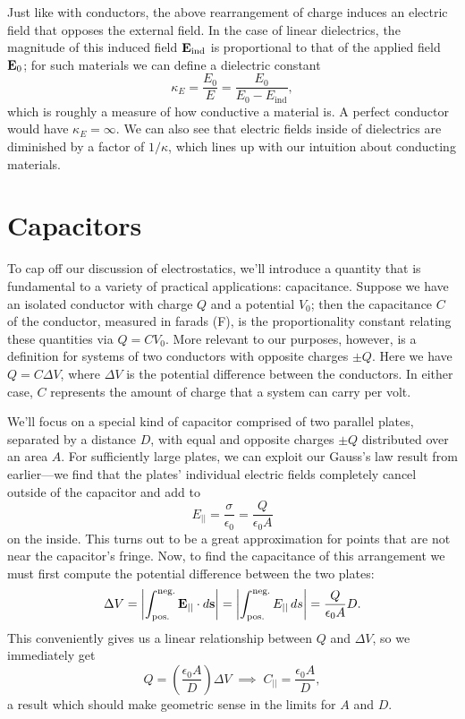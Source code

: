 \documentclass[../p051main.tex]{subfiles}
\begin{document}
Just like with conductors, the above rearrangement of charge induces an electric field that opposes the external field.
In the case of linear dielectrics, the magnitude of this induced field $\mathbf{E}_\textrm{ind}$ is proportional to that of the applied field $\mathbf{E}_0$; for such materials we can define a dielectric constant
\[ \kappa_E = \frac{E_0}{E} = \frac{E_0}{E_0 - E_\textrm{ind}}, \]
which is roughly a measure of how conductive a material is.
A perfect conductor would have $\kappa_E = \infty$.
We can also see that electric fields inside of dielectrics are diminished by a factor of $1 / \kappa$, which lines up with our intuition about conducting materials.

\section{Capacitors}
To cap off our discussion of electrostatics, we'll introduce a quantity that is fundamental to a variety of practical applications: capacitance.
Suppose we have an isolated conductor with charge $Q$ and a potential $V_0$; then the capacitance $C$ of the conductor, measured in farads (F), is the proportionality constant relating these quantities via $Q = CV_0$.
More relevant to our purposes, however, is a definition for systems of two conductors with opposite charges $\pm Q$.
Here we have $Q = C \Delta V$, where $\Delta V$ is the potential difference between the conductors.
In either case, $C$ represents the amount of charge that a system can carry per volt.

We'll focus on a special kind of capacitor comprised of two parallel plates, separated by a distance $D$, with equal and opposite charges $\pm Q$ distributed over an area $A$.
For sufficiently large plates, we can exploit our Gauss's law result from earlier---we find that the plates' individual electric fields completely cancel outside of the capacitor and add to
\[ E_{||} = \frac{\sigma}{\epsilon_0} = \frac{Q}{\epsilon_0 A} \]
on the inside.
This turns out to be a great approximation for points that are not near the capacitor's fringe.
Now, to find the capacitance of this arrangement we must first compute the potential difference between the two plates:
\[ \Delta V = \left| \int_\textrm{pos.}^\textrm{neg.} \mathbf{E}_{||} \cdot d\mathbf{s} \right| = \left| \int_\textrm{pos.}^\textrm{neg.} E_{||} \,ds \right| = \frac{Q}{\epsilon_0 A}D. \]
This conveniently gives us a linear relationship between $Q$ and $\Delta V$, so we immediately get
\[ Q = \left( \frac{\epsilon_0 A}{D} \right) \Delta V \;\implies\; C_{||} = \frac{\epsilon_0 A}{D}, \]
a result which should make geometric sense in the limits for $A$ and $D$.
\end{document}
